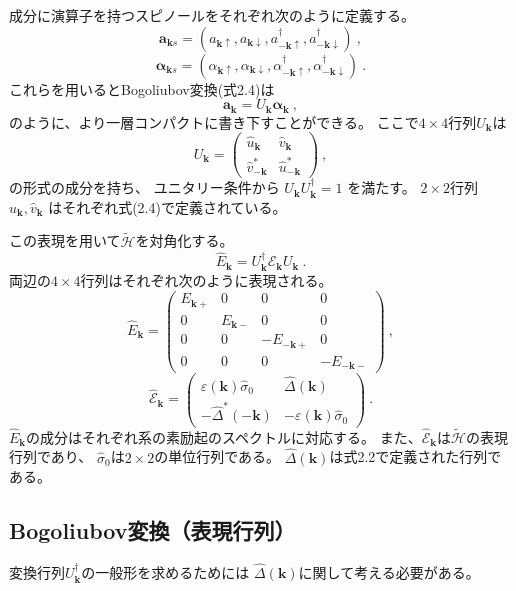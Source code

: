 \documentclass[uplatex,a4j,12pt,dvipdfmx]{jsarticle}
\begin{document}
成分に演算子を持つスピノールをそれぞれ次のように定義する。
\[
	\bm{a}_{\bm{k} s}
	=
	(
	a_{\bm{k} \uparrow}
	,
	a_{\bm{k} \downarrow}
	,
	a_{- \bm{k} \uparrow}^{\dagger}
	,
	a_{- \bm{k} \downarrow}^{\dagger}
	)
	\ , \]\[
	\bm{\alpha}_{\bm{k} s}
	=
	(
	\alpha_{\bm{k} \uparrow}
	,
	\alpha_{\bm{k} \downarrow}
	,
	\alpha_{- \bm{k} \uparrow}^{\dagger}
	,
	\alpha_{- \bm{k} \downarrow}^{\dagger}
	)
	\ .
\]
これらを用いるとBogoliubov変換(式2.4)は
\[
	\bm{a}_{\bm{k}}
	=
	U_{\bm{k}}
	\bm{\alpha}_{\bm{k}}
	\ ,
\]
のように、より一層コンパクトに書き下すことができる。
ここで$4 \times 4$行列$U_{\bm{k}}$は
\[
	U_{\bm{k}}
	=
	\left(
	\begin{array}{cc}
			\hat{u}_{\bm{k}}      & \hat{v}_{\bm{k}}      \\
			\hat{v}_{-\bm{k}}^{*} & \hat{u}_{-\bm{k}}^{*}
		\end{array}
	\right)
	\ ,
\]
の形式の成分を持ち、
ユニタリー条件から
$U_{\bm{k}} U_{\bm{k}}^{\dagger} = 1$
を満たす。
$2 \times 2$行列
$\hat{u}_{\bm{k}} , \hat{v}_{\bm{k}}$
はそれぞれ式(2.4)で定義されている。

この表現を用いて$\tilde{\mathcal{H}}$を対角化する。
\[
	\hat{E}_{\bm{k}}
	=
	U_{\bm{k}}^{\dagger}
	\hat{\mathcal{E}}_{\bm{k}}
	U_{\bm{k}}
	\ .
\]
両辺の$4 \times 4$行列はそれぞれ次のように表現される。
\[
	\hat{E}_{\bm{k}}
	=
	\left(
	\begin{array}{cccc}
			E_{\bm{k} +} & 0            & 0               & 0               \\
			0            & E_{\bm{k} -} & 0               & 0               \\
			0            & 0            & - E_{-\bm{k} +} & 0               \\
			0            & 0            & 0               & - E_{-\bm{k} -}
		\end{array}
	\right)
	\ , \]\[
	\hat{\mathcal{E}}_{\bm{k}}
	=
	\left(
	\begin{array}{cc}
			\varepsilon(\bm{k}) \hat{\sigma}_{0} & \hat{\Delta}(\bm{k})                   \\[2mm]
			- \hat{\Delta}^{*}(-\bm{k})          & - \varepsilon(\bm{k}) \hat{\sigma}_{0}
		\end{array}
	\right)
	\ .
\]
$\hat{E}_{\bm{k}}$の成分はそれぞれ系の素励起のスペクトルに対応する。
また、$\hat{\mathcal{E}}_{\bm{k}}$は$\tilde{\mathcal{H}}$の表現行列であり、
$\hat{\sigma}_{0}$は$2 \times 2$の単位行列である。
$\hat{\Delta}(\bm{k})$は式2.2で定義された行列である。
\subsection{Bogoliubov変換（表現行列）}
変換行列$U_{\bm{k}}^{\dagger}$の一般形を求めるためには
$\hat{\Delta}(\bm{k})$に関して考える必要がある。
\end{document}
